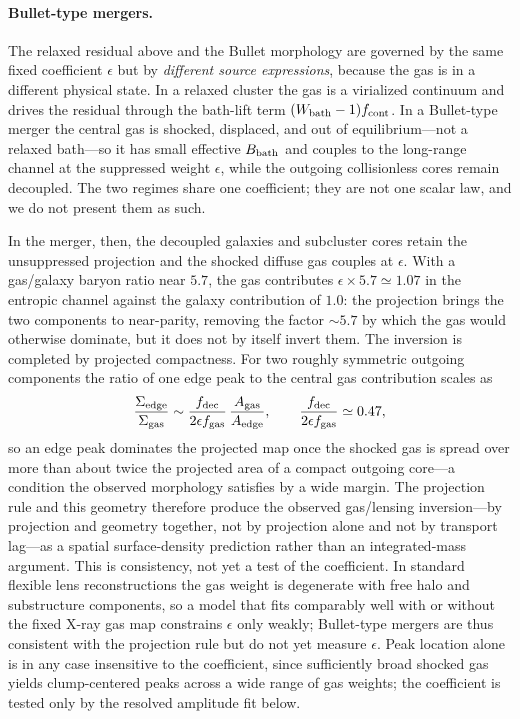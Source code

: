 \documentclass[11pt]{article}
\begin{document}
\paragraph{Bullet-type mergers.}
The relaxed residual above and the Bullet morphology are governed by the same fixed coefficient $\epsilon$ but by \emph{different source expressions}, because the gas is in a different physical state. In a relaxed cluster the gas is a virialized continuum and drives the residual through the bath-lift term $(W_{\rm bath}-1)f_{\rm cont}$. In a Bullet-type merger the central gas is shocked, displaced, and out of equilibrium---not a relaxed bath---so it has small effective $B_{\rm bath}$ and couples to the long-range channel at the suppressed weight $\epsilon$, while the outgoing collisionless cores remain decoupled. The two regimes share one coefficient; they are not one scalar law, and we do not present them as such.

In the merger, then, the decoupled galaxies and subcluster cores retain the unsuppressed projection and the shocked diffuse gas couples at $\epsilon$. With a gas/galaxy baryon ratio near $5.7$, the gas contributes $\epsilon\times5.7\simeq1.07$ in the entropic channel against the galaxy contribution of $1.0$: the projection brings the two components to near-parity, removing the factor $\sim\!5.7$ by which the gas would otherwise dominate, but it does not by itself invert them. The inversion is completed by projected compactness. For two roughly symmetric outgoing components the ratio of one edge peak to the central gas contribution scales as
\[
\frac{\Sigma_{\rm edge}}{\Sigma_{\rm gas}}
\sim
\frac{f_{\rm dec}}{2\epsilon f_{\rm gas}}\,
\frac{A_{\rm gas}}{A_{\rm edge}},
\qquad
\frac{f_{\rm dec}}{2\epsilon f_{\rm gas}}\simeq0.47 ,
\]
so an edge peak dominates the projected map once the shocked gas is spread over more than about twice the projected area of a compact outgoing core---a condition the observed morphology satisfies by a wide margin. The projection rule and this geometry therefore produce the observed gas/lensing inversion---by projection and geometry together, not by projection alone and not by transport lag---as a spatial surface-density prediction rather than an integrated-mass argument. This is consistency, not yet a test of the coefficient. In standard flexible lens reconstructions the gas weight is degenerate with free halo and substructure components, so a model that fits comparably well with or without the fixed X-ray gas map constrains $\epsilon$ only weakly; Bullet-type mergers are thus consistent with the projection rule but do not yet measure $\epsilon$. Peak location alone is in any case insensitive to the coefficient, since sufficiently broad shocked gas yields clump-centered peaks across a wide range of gas weights; the coefficient is tested only by the resolved amplitude fit below.
\end{document}
